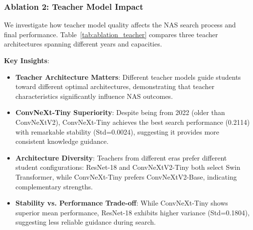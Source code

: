 
\subsubsection{Ablation 2: Teacher Model Impact}
\label{subsubsec:ablation_teacher}

We investigate how teacher model quality affects the NAS search process and final performance. Table~\ref{tab:ablation_teacher} compares three teacher architectures spanning different years and capacities.

\begin{table}[t]
\centering
\caption{Ablation study on teacher model impact. Different teachers guide students to discover different optimal architectures. ConvNeXt-Tiny achieves the best NAS search performance with highest stability.}
\label{tab:ablation_teacher}
\end{table}

\textbf{Key Insights}:
\begin{itemize}
    \item \textbf{Teacher Architecture Matters}: Different teacher models guide students toward different optimal architectures, demonstrating that teacher characteristics significantly influence NAS outcomes.
    \item \textbf{ConvNeXt-Tiny Superiority}: Despite being from 2022 (older than ConvNeXtV2), ConvNeXt-Tiny achieves the best search performance (0.2114) with remarkable stability (Std=0.0024), suggesting it provides more consistent knowledge guidance.
    \item \textbf{Architecture Diversity}: Teachers from different eras prefer different student configurations: ResNet-18 and ConvNeXtV2-Tiny both select Swin Transformer, while ConvNeXt-Tiny prefers ConvNeXtV2-Base, indicating complementary strengths.
    \item \textbf{Stability vs. Performance Trade-off}: While ConvNeXt-Tiny shows superior mean performance, ResNet-18 exhibits higher variance (Std=0.1804), suggesting less reliable guidance during search.
\end{itemize}

